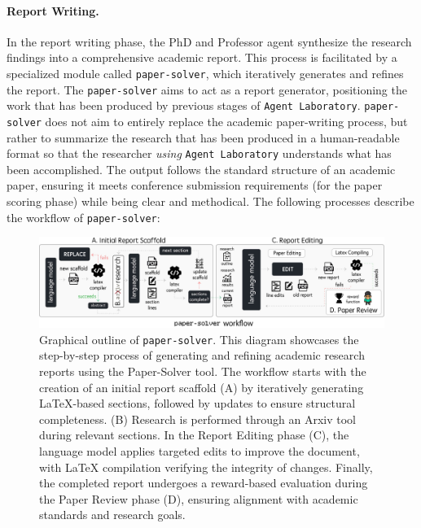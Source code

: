 \documentclass[11pt, a4paper]{gdm_format}
\begin{document}
\paragraph{Report Writing.} In the report writing phase, the PhD and Professor agent synthesize the research findings into a comprehensive academic report. This process is facilitated by a specialized module called \texttt{paper-solver}, which iteratively generates and refines the report. The \texttt{paper-solver} aims to act as a report generator, positioning the work that has been produced by previous stages of \texttt{Agent Laboratory}. \texttt{paper-solver} does not aim to entirely replace the academic paper-writing process, but rather to summarize the research that has been produced in a human-readable format so that the researcher \textit{using} \texttt{Agent Laboratory} understands what has been accomplished.  
The output follows the standard structure of an academic paper, ensuring it meets conference submission requirements (for the paper scoring phase) while being clear and methodical. The following processes describe the workflow of \texttt{paper-solver}:


\begin{figure}
    \centering
    \includegraphics[width=0.99\linewidth]{images/jpgs/paper_workflow.jpg}
    \caption{Graphical outline of \texttt{paper-solver}. This diagram showcases the step-by-step process of generating and refining academic research reports using the Paper-Solver tool. The workflow starts with the creation of an initial report scaffold (A) by iteratively generating LaTeX-based sections, followed by updates to ensure structural completeness. (B) Research is performed through an Arxiv tool during relevant sections. In the Report Editing phase (C), the language model applies targeted edits to improve the document, with LaTeX compilation verifying the integrity of changes. Finally, the completed report undergoes a reward-based evaluation during the Paper Review phase (D), ensuring alignment with academic standards and research goals.}
    \label{fig:PaperSolver}
\end{figure}
\end{document}
